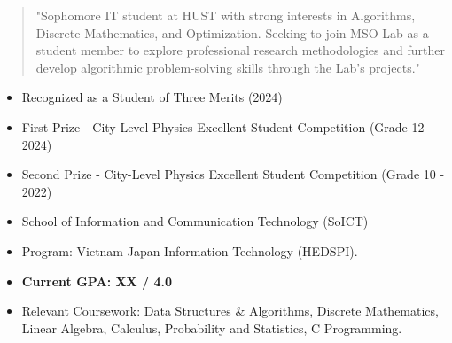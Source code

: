 \documentclass[12 pt,a4paper,ragged2e]{altacv}
\begin{document}


\begin{fullwidth}
\makecvheader
\end{fullwidth}



\begin{fullwidth}
  \begin{quote}
    \normalsize{"Sophomore IT student at HUST with strong interests in Algorithms, Discrete Mathematics, and Optimization. Seeking to join MSO Lab as a student member to explore professional research methodologies and further develop algorithmic problem-solving skills through the Lab's projects."}
  \end{quote}
\end{fullwidth}

\begin{itemize}
  \item Recognized as a Student of Three Merits (2024)
  \item First Prize - City-Level Physics Excellent Student Competition (Grade 12 - 2024)
  \item Second Prize - City-Level Physics Excellent Student Competition (Grade 10 - 2022)
\end{itemize}


\begin{itemize}
  \item School of Information and Communication Technology (SoICT)
  \item Program: Vietnam-Japan Information Technology (HEDSPI).
  \item \textbf{Current GPA: XX / 4.0}
  \item Relevant Coursework: Data Structures \& Algorithms, Discrete Mathematics,
Linear Algebra, Calculus, Probability and Statistics, C Programming.
\end{itemize}
\end{document}
